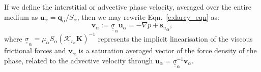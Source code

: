 \documentclass[preprint,authoryear,12pt]{elsarticle}
\begin{document}
If we define the interstitial or advective phase velocity, averaged over the entire medium as $\mathbf{u}_\alpha= \mathbf{q}_\alpha/S_\alpha$, then we may rewrite Eqn.~\ref{e:darcy_eqn} as:
\begin{equation}
  \bm{v}_\alpha:= {\underline {\underline \sigma}}_{\alpha} \mathbf{u}_{\alpha} = - \nabla p + {\mathbf{s}_{u}}_{\alpha},
  \label{force-bal}
\end{equation}
where ${\underline {\underline \sigma}}_{\alpha}=\mu_\alpha S_\alpha \left(\mathcal{K}_{{r}_\alpha}\mathbf{K}\right)^{-1}$ represents the implicit linearisation of the viscous frictional forces and $\bm{v}_\alpha$ is a saturation averaged vector of the force density of the phase, related to the advective velocity through $\bm{u}_\alpha={\underline {\underline \sigma}}_{\alpha}^{-1}\bm{v}_\alpha$.%
\end{document}
